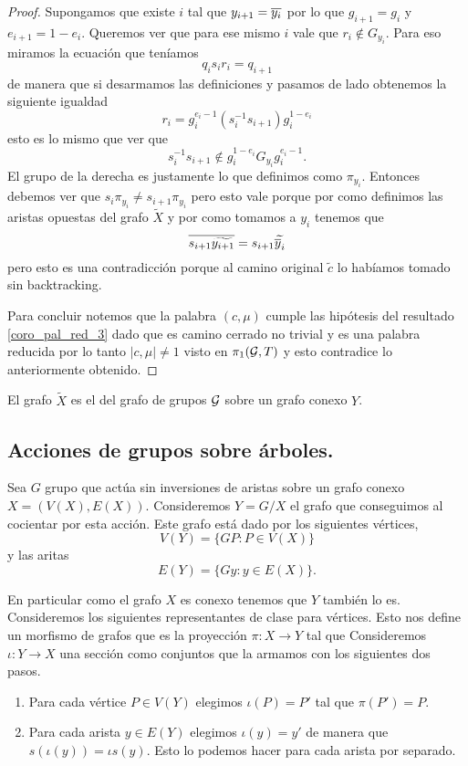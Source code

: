 \documentclass[tesis.tex]{subfiles}
\newcommand{\cG}{ {\cal G} }
\begin{document}
\begin{proof}
	Supongamos que existe $i$ tal que $y_{i+1} = \overline{y_i}$ por lo que $g_{i+1} = g_{i}$ y $e_{i+1} = 1 - e_i$.
	Queremos ver que para ese mismo $i$ vale que $r_i \notin G_{y_i}$.
	Para eso miramos la ecuación que teníamos 
	\[
		q_is_ir_i = q_{i+1}
	\]
	de manera que si desarmamos las definiciones y pasamos de lado obtenemos la siguiente igualdad
	\[
		r_i = g_i^{e_i - 1} (s_i^{-1} s_{i+1}) g_i^{1-e_i}
	\]
	esto es lo mismo que ver que 
	\[
		s_i^{-1}s_{i+1} \notin g_i^{1-e_i}G_{y_i} g_i^{e_i - 1}.
	\]
	El grupo de la derecha es justamente lo que definimos como $\pi_{y_i}$.
	Entonces debemos ver que $s_i\pi_{y_i} \neq s_{i+1} \pi_{y_i}$ pero esto vale porque por como definimos las aristas opuestas del grafo $\tilde X$ y por como tomamos a $y_i$ tenemos que 
	\[
	\overline{s_{i+1} \widetilde{y_{i+1}}} = s_{i+1} \widetilde{\overline y_i} 
	\]
	pero esto es una contradicción porque al camino original $\tilde c$ lo habíamos tomado sin backtracking.
	
	Para concluir notemos que la palabra $(c, \mu)$ cumple las hipótesis del resultado \ref{coro_pal_red_3} dado que es camino cerrado no trivial y es una palabra reducida por lo tanto $|c, \mu| \neq 1$ visto en $\pi_1(\cG, T)$ y esto contradice lo anteriormente obtenido.
\end{proof}


\begin{deff}
	El grafo $\tilde X$ es el  del grafo de grupos $\cG$ sobre un grafo conexo $Y$.
\end{deff}

%

\subsection{Acciones de grupos sobre árboles.}

Sea $G$ grupo que actúa sin inversiones de aristas sobre un grafo conexo $X = (V(X),E(X))$.
Consideremos $Y = G / X$ el grafo que conseguimos al cocientar por esta acción.
Este grafo está dado por los siguientes vértices,
\[
	V(Y) = \{ G P :  P \in V(X)    \}
\]
y las  aritas 
\[
	E(Y) = \{  Gy  : y \in E(X)  \}.
\]

En particular como el grafo $X$ es conexo tenemos que $Y$ también lo es.
Consideremos los siguientes representantes de clase para vértices. 
Esto nos define un morfismo de grafos que es la proyección $\pi: X \to Y$ tal que
Consideremos $\iota: Y \to X$ una sección como conjuntos que la armamos con los siguientes dos pasos.
\begin{enumerate}
	\item Para cada vértice $P \in V(Y)$ elegimos $\iota (P) = P'$ tal que $\pi(P') = P$.
	\item Para cada arista $y \in E(Y)$ elegimos $\iota(y) = y'$ de manera que $s(\iota(y)) = \iota s(y)$. 
	Esto lo podemos hacer para cada arista por separado.
\end{enumerate}
\end{document}
